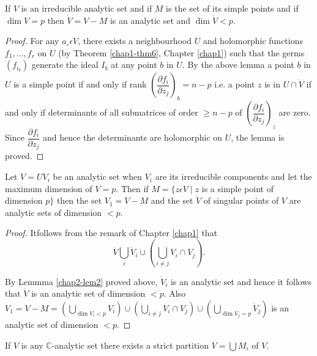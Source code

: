 \begin{lemma}\label{chap2-lem2} %
  If  $V$  is an  irreducible analytic set and if $M$  is the set of
  its  simple points  and if $ \dim V= p $ then $\dot{V} = V-M$    is
  an analytic set and $\dim  \dot{V} < p$. 
\end{lemma}

\begin{proof} %
  For any $a_\circ \epsilon  V$, there exists a neighbourhood  $U$ and
  holomorphic functions $f_1,\ldots , f_r$ on $U$ (by Theorem
  \ref{chap1-thm6}, Chapter \ref{chap1})  such that the germs
  $(f_{i_{b}})$ generate the 
  ideal $I_b$ at any point  $b$ in $U$. By the above lemma a point
  $b$ in $U$ is a simple  point  if and only if rank $\left(\dfrac{\partial
    f_i}{\partial z_j}\right)_{b} = n-p$ i.e. a point  $z$ is  in  $U \cap
  \dot{V}$   if  and only if determinants of all submatrices of order
  $\ge n-p$ of $\left(\dfrac{\partial f_i}{\partial z_{j}}\right)_{z}$ are
  zero. Since $\dfrac{\partial f_i}{\partial z_j}$  and hence the
  determinants are holomorphic on  $U$, the lemma is proved.    
\end{proof}

\begin{lemma}\label{chap2-lem3} %
 Let $V = U V_i$ be an analytic set when $V_i$ are its irreducible
 components and let the maximum dimension of $V=p$. Then if $M = \{ z
 \epsilon V \mid z$ is a simple point  of dimension $p \}$ then the
 set $V_1= V-M$ and the set $\dot{V}$ of  singular points of $V$ are
 analytic sets of dimension $ < p$. 
\end{lemma}

\begin{proof} %
  It\pageoriginale follows  from the remark of Chapter \ref{chap1}
  that 
$$
\dot{V}
  \bigcup\limits_{i} \dot{V}_{i} \cup  \left(\bigcup\limits_{i\neq j}
  V_i \cap V_j\right).
$$ 

By Lemmma \ref{chap2-lem2} 
  proved above, $\dot{V}_i$ is an
  analytic  set and hence it follows that $\dot{V}$ is an analytic set
  of dimension $< p$. Also $V_1 = V-M = \left(\bigcup\limits_{\dim V_i <
    p} V_i\right)\cup \left(\bigcup\limits_{i\neq j}V_i
  \cap V_j\right) 
  \cup \left(\bigcup\limits_{\dim V_j=p}\dot{V}_j\right)$ is an analytic  set
  of dimension $< p$. 
\end{proof}

\setcounter{proposition}{0}
\begin{proposition}\label{chap2-prop1} %
If $V$ is any $\mathbb{C}$-analytic set there exists a strict
partition $V = \bigcup M_i $ of $V$.  
\end{proposition}

